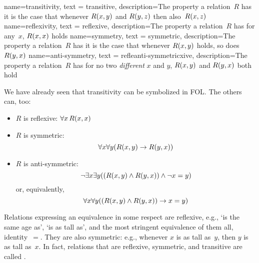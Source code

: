 
{
  name=transitivity,
  text = transitive,
  description={The property a relation~$R$ has \ifeff{} it is the case
  that whenever $\mathord{R}(x,y)$ and $\mathord{R}(y,z)$ then also~$\mathord{R}(x,z)$}
}
{
  name=reflexivity,
  text = reflexive,
  description={The property a relation~$R$ has \ifeff{} for any~$x$, $\mathord{R}(x,x)$ holds}
}
{
  name=symmetry,
  text = symmetric,
  description={The property a relation~$R$ has \ifeff{} it is the case
  that whenever $\mathord{R}(x,y)$ holds, so does $\mathord{R}(y,x)$}
}
{
  name=anti-symmetry,
  text = refleanti-symmetricxive,
  description={The property a relation~$R$ has \ifeff{} for no two
	\emph{different} $x$ and $y$, $\mathord{R}(x,y)$ and $\mathord{R}(y,x)$
	both hold}
}

We have already seen that transitivity can be symbolized in FOL. The
others can, too:
\begin{itemize}
	\item $R$ is reflexive: $\forall x\,\mathord{R}(x,x)$
	\item $R$ is symmetric: \[\forall x\forall y(\mathord{R}(x,y) \rightarrow \mathord{R}(y,x))\]
	\item $R$ is anti-symmetric: \[\lnot\exists x\exists y((\mathord{R}(x,y)
	\wedge \mathord{R}(y,x)) \wedge \neg x=y)\] or, equivalently, \[\forall x\forall y((\mathord{R}(x,y)
	\wedge \mathord{R}(y,x)) \rightarrow x=y)\]
\end{itemize}

Relations expressing an equivalence in some respect are reflexive,
e.g., `is the same age as', `is as tall as', and the most stringent
equivalence of them all, identity~$=$. They are also symmetric: e.g.,
whenever $x$ is as tall as~$y$, then $y$ is as tall as~$x$. In fact,
relations that are reflexive, symmetric, and transitive are called
.


